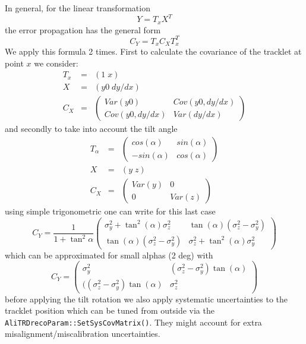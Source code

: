 \documentclass{alicetdr}
\begin{document}
In general, for the linear transformation
\begin{equation}
Y = T_{x} X^{T}
\end{equation}
the error propagation has the general form
\begin{equation}
C_{Y} = T_{x} C_{X} T_{x}^{T} 
\end{equation}
We apply this formula 2 times. First to calculate the covariance of the tracklet 
at point $x$ we consider: 
\begin{eqnarray}
T_{x} &=& (1\; x)\\ 
X&=&(y0\; dy/dx)\\
C_{X}&=&
  \left( \begin{array}{cc}
    Var(y0) & Cov(y0, dy/dx)\\
    Cov(y0, dy/dx) & Var(dy/dx) 
  \end{array} \right)
\end{eqnarray}
and secondly to take into account the tilt angle
\begin{eqnarray}
T_{\alpha}& = &
  \left( \begin{array}{cc}
    cos(\alpha)&sin(\alpha)\\
    -sin(\alpha)& cos(\alpha)
  \end{array} \right)\\
X&=&(y\; z)\\ 
C_{X}&=&
  \left( \begin{array}{cc}
    Var(y) &0\\
    0 &Var(z) 
  \end{array} \right)
\end{eqnarray}
using simple trigonometric one can write for this last case
\begin{equation}
C_{Y}=\frac{1}{1+\tan^{2}\alpha} 
  \left( \begin{array}{cc}
    \sigma_{y}^{2}+\tan^{2}(\alpha)\sigma_{z}^{2} &  
    \tan(\alpha)(\sigma_{z}^{2}-\sigma_{y}^{2})\\
    \tan(\alpha)(\sigma_{z}^{2}-\sigma_{y}^{2}) & 
    \sigma_{z}^{2}+\tan^{2}(\alpha)\sigma_{y}^{2}
  \end{array} \right)
\end{equation}
which can be approximated for small alphas (2 deg) with
\begin{equation}
C_{Y}=
  \left( \begin{array}{cc}
    \sigma_{y}^{2} & (\sigma_{z}^{2}-\sigma_{y}^{2})\tan(\alpha)\\
    ((\sigma_{z}^{2}-\sigma_{y}^{2})\tan(\alpha) & \sigma_{z}^{2} 
  \end{array} \right)
\end{equation}
before applying the tilt rotation we also apply systematic uncertainties 
to the tracklet position which can be tuned from outside via the 
{\tt AliTRDrecoParam::SetSysCovMatrix()}. They might account for extra 
misalignment/miscalibration uncertainties. 
\end{document}
